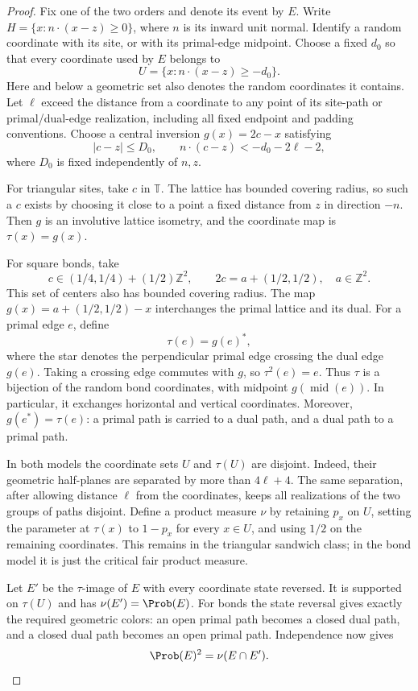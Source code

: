 \begin{proof}
Fix one of the two orders and denote its event by $E$.
Write $H=\{x:n\cdot(x-z)\ge0\}$, where $n$ is its inward unit normal.
Identify a random coordinate with its site, or with its primal-edge midpoint.
Choose a fixed $d_0$ so that every coordinate used by $E$ belongs to
\[
 U=\{x:n\cdot(x-z)\ge-d_0\}.
\]
Here and below a geometric set also denotes the random coordinates it contains.
Let $\ell$ exceed the distance from a coordinate to any point of its site-path
or primal/dual-edge realization, including all fixed endpoint and padding
conventions.  Choose a central inversion $g(x)=2c-x$ satisfying
\begin{equation*}
 |c-z|\le D_0,\qquad
 n\cdot(c-z)<-d_0-2\ell-2,
\end{equation*}
where $D_0$ is fixed independently of $n,z$.

For triangular sites, take $c$ in $\mathbb T$.  The lattice has bounded
covering radius, so such a $c$ exists by choosing it close to a point a fixed
distance from $z$ in direction $-n$.  Then $g$ is an involutive lattice
isometry, and the coordinate map is $\tau(x)=g(x)$.

For square bonds, take
\[
 c\in(1/4,1/4)+(1/2)\mathbb Z^2,
 \qquad 2c=a+(1/2,1/2),\quad a\in\mathbb Z^2.
\]
This set of centers also has bounded covering radius.  The map
$g(x)=a+(1/2,1/2)-x$ interchanges the primal lattice and its dual.  For a
primal edge $e$, define
\[
 \tau(e)=g(e)^*,
\]
where the star denotes the perpendicular primal edge crossing the dual edge
$g(e)$.  Taking a crossing edge commutes with $g$, so $\tau^2(e)=e$.
Thus $\tau$ is a bijection of the random bond coordinates, with midpoint
$g(\operatorname{mid}(e))$.  In particular, it exchanges horizontal and
vertical coordinates.  Moreover,
$g(e^*)=\tau(e)$: a primal path is carried to a dual path, and a dual path
to a primal path.

In both models the coordinate sets $U$ and $\tau(U)$ are disjoint.  Indeed,
their geometric half-planes are separated by more than $4\ell+4$.
The same separation, after allowing distance $\ell$ from the coordinates,
keeps all realizations of the two groups of paths disjoint.
Define a product measure $\nu$ by retaining $p_x$ on $U$, setting the
parameter at $\tau(x)$ to $1-p_x$ for every $x\in U$, and using $1/2$
on the remaining coordinates.  This remains in the triangular sandwich
class; in the bond model it is just the critical fair product measure.

Let $E'$ be the $\tau$-image of $E$ with every coordinate state reversed.
It is supported on $\tau(U)$ and has $\nu(E')=\Prob(E)$.
For bonds the state reversal gives exactly the required geometric colors:
an open primal path becomes a closed dual path, and a closed dual path
becomes an open primal path.  Independence now gives
\begin{equation}\label{eq:reflectsquare}
 \Prob(E)^2=\nu(E\cap E').
\end{equation}


\end{proof}
